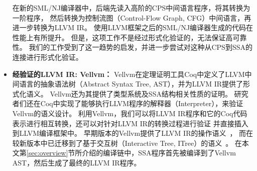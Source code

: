\begin{itemize}
    在新的SML/NJ编译器中，后端先读入高阶的CPS中间语言程序，将其转换为一阶程序，
    然后转换为控制流图（Control-Flow Graph, CFG）中间语言，再进一步转换为LLVM IR。
    使用LLVM框架之后的SML/NJ编译器生成的代码在性能上有所提升。
    但是，这项工作不是经过形式化验证的，无法保证高可靠性。
    我们的工作受到了这一趋势的启发，并进一步尝试对这种从CPS到SSA的连接进行形式化验证。
    \item \textbf{经验证的LLVM IR: Vellvm：} 
    Vellvm在定理证明工具Coq中定义了LLVM中间语言的抽象语法树（Abstract Syntax Tree, AST），并为LLVM IR提供了形式化语义。
    Vellvm还为其提供了类型系统及SSA结构相关性质的证明。
    研究者们还在Coq中实现了能够执行LLVM程序的解释器（Interpreter），来验证Vellvm的语义设计。
    利用Vellvm，我们可以将LLVM IR程序和它的Coq代码表示进行相互转换，还可以对针对LLVM IR的转换过程进行验证
    并直接插入到LLVM编译框架中。
    早期版本的Vellvm提供了LLVM IR的操作语义~\cite{zhao2012formalizing}，
    而在较新版本中已迁移到了基于交互树（Interactive Tree, ITree）的语义~\cite{zakowski2021modular}。
    在本文第\ref{sec:overview}节所介绍的编译链中，SSA程序首先被编译到了Vellvm AST，然后生成了最终的LLVM IR程序。
\end{itemize}

